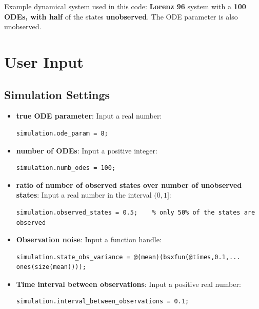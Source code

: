 Example dynamical system used in this code: \textbf{Lorenz 96} system with a \textbf{100 ODEs, with half} of the states \textbf{unobserved}. The ODE parameter is also unobserved.

\section{User Input}
\subsection{Simulation Settings}
\vspace{1em}
\begin{itemize}
   \item \textbf{true ODE parameter}: Input a real number:
\color{RoyalPurple}\begin{verbatim}
simulation.ode_param = 8;
\end{verbatim} 
\color{black}

   \item \textbf{number of ODEs}: Input a positive integer:
\color{RoyalPurple}\begin{verbatim}
simulation.numb_odes = 100;
\end{verbatim} 
\color{black}

   \item \textbf{ratio of number of observed states over number of unobserved states}: Input a real number in the interval $(0,1]$:
\color{black}
    \color{RoyalPurple}\begin{verbatim}
simulation.observed_states = 0.5;    % only 50% of the states are observed
\end{verbatim} 
\color{black}

   \item \textbf{Observation noise}: Input a function handle:
\color{RoyalPurple}\begin{verbatim}
simulation.state_obs_variance = @(mean)(bsxfun(@times,0.1,...
ones(size(mean))));
\end{verbatim} 
\color{black}

   \item \textbf{Time interval between observations}: Input a positive real number:

    \color{RoyalPurple}\begin{verbatim}
simulation.interval_between_observations = 0.1;
\end{verbatim} 
\color{black}
\end{itemize}

